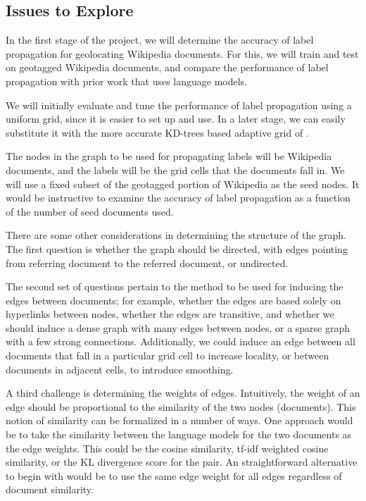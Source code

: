 \documentclass[11pt]{article}
\begin{document}
\subsection{Issues to Explore}
In the first stage of the project, we will determine the accuracy of label propagation for geolocating Wikipedia documents.
For this, we will train and test on geotagged Wikipedia documents, and compare the performance of label propagation with prior work that uses language models.

We will initially evaluate and tune the performance of label propagation using a uniform grid, since it is easier to set up and use.
In a later stage, we can easily substitute it with the more accurate KD-trees based adaptive grid of \cite{rolleretal:12}.

The nodes in the graph to be used for propagating labels will be Wikipedia documents, and the labels will be the grid cells that the documents fall in.
We will use a fixed subset of the geotagged portion of Wikipedia as the seed nodes.
It would be instructive to examine the accuracy of label propagation as a function of the number of seed documents used. 

There are some other considerations in determining the structure of the graph.
The first question is whether the graph should be directed, with edges pointing from referring document to the referred document, or undirected. 

The second set of questions pertain to the method to be used for inducing the edges between documents;
for example, whether the edges are based solely on hyperlinks between nodes, whether the edges are transitive, and whether we should induce a dense graph with many edges between nodes, or a sparse graph with a few strong connections.
Additionally, we could induce an edge between all documents that fall in a particular grid cell to increase locality, or between documents in adjacent cells, to introduce smoothing.

A third challenge is determining the weights of edges.
Intuitively, the weight of an edge should be proportional to the similarity of the two nodes (documents).
This notion of similarity can be formalized in a number of ways.
One approach would be to take the similarity between the language models for the two documents as the edge weights.
This could be the cosine similarity, tf-idf weighted cosine similarity, or the KL divergence score for the pair.
An straightforward alternative to begin with would be to use the same edge weight for all edges regardless of document similarity.
 
\end{document}
